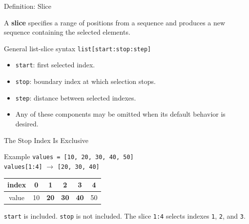 \documentclass[aspectratio=169,10pt]{beamer}
\begin{document}
\begin{frame}{Definition: Slice}
  \begin{cpdefinition}
    A \textbf{slice} specifies a range of positions from a sequence and produces a new sequence containing the selected elements.
  \end{cpdefinition}

  \begin{block}{General list-slice syntax}
    \centering
    \Large\texttt{list[start:stop:step]}
  \end{block}

  \begin{itemize}
    \item \texttt{start}: first selected index.
    \item \texttt{stop}: boundary index at which selection stops.
    \item \texttt{step}: distance between selected indexes.
    \item Any of these components may be omitted when its default behavior is desired.
  \end{itemize}
\end{frame}

\begin{frame}{The Stop Index Is Exclusive}
  \begin{block}{Example}
    \texttt{values = [10, 20, 30, 40, 50]}\\[0.10in]
    \centering
    \Large\texttt{values[1:4]} $\longrightarrow$ \texttt{[20, 30, 40]}
  \end{block}

  \begin{center}
    \renewcommand{\arraystretch}{1.25}
    \begin{tabular}{c|c|c|c|c|c}
      index & 0 & \textbf{1} & \textbf{2} & \textbf{3} & 4 \\\hline
      value & 10 & \textbf{20} & \textbf{30} & \textbf{40} & 50
    \end{tabular}
  \end{center}

  \begin{keyidea}
    \texttt{start} is included. \texttt{stop} is not included. The slice \texttt{1:4} selects indexes \texttt{1}, \texttt{2}, and \texttt{3}.
  \end{keyidea}
\end{frame}
\end{document}
